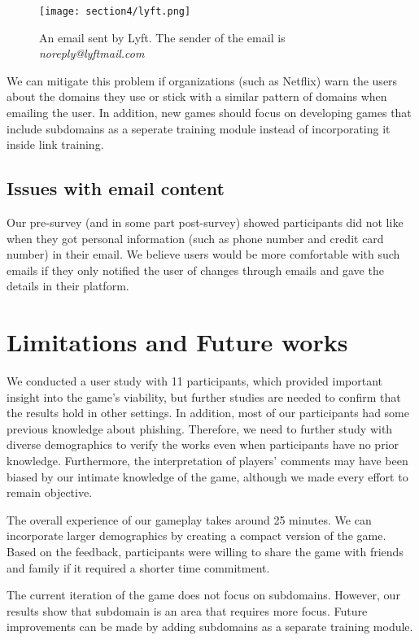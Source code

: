 \begin{figure}
    \centering
    \texttt{[image: section4/lyft.png]}
    \caption[An email sent by Lyft]{An email sent by Lyft. The sender of the email is \textit{noreply@lyftmail.com}}
    \label{fig:lyft}
\end{figure}

We can mitigate this problem if organizations (such as Netflix) warn the users about the domains they use or stick with a similar pattern of domains when emailing the user. In addition, new games should focus on developing games that include subdomains as a seperate training module instead of incorporating it inside link training.

\subsection{Issues with email content}
Our pre-survey (and in some part post-survey) showed participants did not like when they got personal information (such as phone number and credit card number) in their email. We believe users would be more comfortable with such emails if they only notified the user of changes through emails and gave the details in their platform.

\section{Limitations and Future works}
We conducted a user study with 11 participants, which provided important insight into the game's viability, but further studies are needed to confirm that the results hold in other settings. In addition, most of our participants had some previous knowledge about phishing. Therefore, we need to further study with diverse demographics to verify the works even when participants have no prior knowledge. Furthermore, the interpretation of players' comments may have been biased by our intimate knowledge of the game, although we made every effort to remain objective.

The overall experience of our gameplay takes around 25 minutes. We can incorporate larger demographics by creating a compact version of the game. Based on the feedback, participants were willing to share the game with friends and family if it required a shorter time commitment.

The current iteration of the game does not focus on subdomains. However, our results show that subdomain is an area that requires more focus. Future improvements can be made by adding subdomains as a separate training module.


